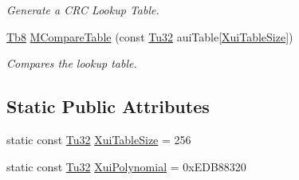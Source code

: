 \begin{DoxyCompactItemize}
\begin{DoxyCompactList}\small\item\em Generate a C\+RC Lookup Table. \end{DoxyCompactList}\item 
\mbox{\hyperlink{namespace_g_n_common_a8115dc7ed53b6e5b52e6bfde1632ea74}{Tb8}} \mbox{\hyperlink{class_g_n_common_1_1_n_data_authentication_1_1_tc_c_r_c32_a2f822ac900cdba0a94b8e9361eb86b5c}{M\+Compare\+Table}} (const \mbox{\hyperlink{namespace_g_n_common_a941b527ef318f318aed7903dc832b7e4}{Tu32}} aui\+Table\mbox{[}\mbox{\hyperlink{class_g_n_common_1_1_n_data_authentication_1_1_tc_c_r_c32_a520aaabe0f4ade7f38afd480281b2180}{Xui\+Table\+Size}}\mbox{]})
\begin{DoxyCompactList}\small\item\em Compares the lookup table. \end{DoxyCompactList}\end{DoxyCompactItemize}
\subsection*{Static Public Attributes}
\begin{DoxyCompactItemize}
\item 
static const \mbox{\hyperlink{namespace_g_n_common_a941b527ef318f318aed7903dc832b7e4}{Tu32}} \mbox{\hyperlink{class_g_n_common_1_1_n_data_authentication_1_1_tc_c_r_c32_a520aaabe0f4ade7f38afd480281b2180}{Xui\+Table\+Size}} = 256
\item 
static const \mbox{\hyperlink{namespace_g_n_common_a941b527ef318f318aed7903dc832b7e4}{Tu32}} \mbox{\hyperlink{class_g_n_common_1_1_n_data_authentication_1_1_tc_c_r_c32_ab4394051ff10830de29fa62cbb6f1490}{Xui\+Polynomial}} = 0x\+E\+D\+B88320
\end{DoxyCompactItemize}
